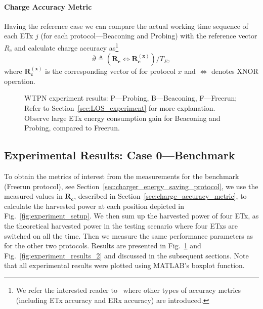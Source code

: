 \documentclass[11pt,draftclsnofoot,journal,onecolumn]{IEEEtran}
\begin{document}
\paragraph{Charge Accuracy Metric}

Having the reference case we can compare the actual working time sequence of each ETx $j$ (for each protocol---Beaconing and Probing) with the reference vector $R_c$ and calculate charge accuracy as\footnote{We refer the interested reader to~\cite[Ch. 5]{golinski_msc_2015} where other types of accuracy metrics (including ETx accuracy and ERx accuracy) are introduced.} 
\begin{equation}
\boxed{\overline \vartheta\triangleq (\mathbf{R_c}\Leftrightarrow \mathbf{R_c^{(x)}})/T_{E}},
\end{equation}
where $\mathbf{R_c^{(x)}}$ is the corresponding vector of for protocol $x$ and $\Leftrightarrow$ denotes XNOR operation.
\begin{figure}
\centering
{}
\caption{WTPN experiment results: P---Probing, B---Beaconing, F---Freerun; Refer to Section~\ref{sec:LOS_experiment} for more explanation. Observe large ETx energy consumption gain for Beaconing and Probing, compared to Freerun.}
\label{fig:experiment_results_1}
\end{figure}

\subsection{Experimental Results: Case 0---Benchmark}
\label{sec:benchmark_measurements}

To obtain the metrics of interest from the measurements for the benchmark (Freerun protocol), see Section~\ref{sec:charger_energy_saving_protocol}, we use the measured values in $\mathbf{R_c}$, described in Section~\ref{sec:charge_accuracy_metric}, to calculate the harvested power at each position depicted in Fig.~\ref{fig:experiment_setup}. We then sum up the harvested power of four ETx, as the theoretical harvested power in the testing scenario where four ETxs are switched on all the time. Then we measure the same performance parameters as for the other two protocols. Results are presented in Fig.~\ref{fig:experiment_results_1} and Fig.~\ref{fig:experiment_results_2} and discussed in the subsequent sections. Note that all experimental results were plotted using MATLAB's \textsf{boxplot} function.
\end{document}
